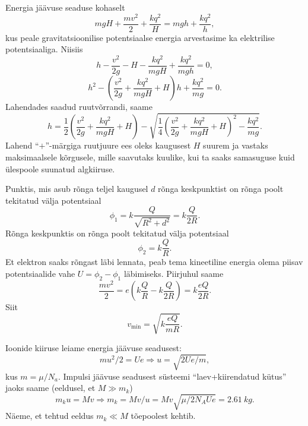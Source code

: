 \documentclass[10pt]{article}
\begin{document}
{%

\solu
Energia jäävuse seaduse kohaselt
\[
mgH + \frac{mv^2}{2} + \frac{kq^2}{H} = mgh + \frac{kq^2}{h},
\]
kus peale gravitatsioonilise potentsiaalse energia arvestasime ka elektrilise potentsiaaliga. Niisiis
\[
h-\frac{v^{2}}{2 g}-H-\frac{k q^{2}}{m g H}+\frac{k q^{2}}{m g h}=0,
\]
\[
h^{2}-\left(\frac{v^{2}}{2 g}+\frac{k q^{2}}{m g H}+H\right) h+\frac{k q^{2}}{m g}=0.
\]
Lahendades saadud ruutvõrrandi, saame
\[
h=\frac{1}{2}\left(\frac{v^{2}}{2 g}+\frac{k q^{2}}{m g H}+H\right)-\sqrt{\frac{1}{4}\left(\frac{v^{2}}{2 g}+\frac{k q^{2}}{m g H}+H\right)^{2}-\frac{k q^{2}}{m g}}.
\]
Lahend \enquote{$+$}-märgiga ruutjuure ees oleks kaugusest $H$ suurem ja vastaks maksimaalsele kõrgusele, mille saavutaks kuulike, kui ta saaks samasuguse kuid ülespoole suunatud algkiiruse.
\probend
\bigskip


\solu
Punktis, mis asub rõnga teljel kaugusel $d$ rõnga keskpunktist on rõnga poolt tekitatud välja potentsiaal
\[
\phi_{1}=k \frac{Q}{\sqrt{R^{2}+d^{2}}}=k \frac{Q}{2 R}.
\]
Rõnga keskpunktis on rõnga poolt tekitatud välja potentsiaal
\[
\phi_{2}=k \frac{Q}{R}.
\]
Et elektron saaks rõngast läbi lennata, peab tema kineetiline energia olema piisav
potentsiaalide vahe $U = \phi_2 - \phi_1$ läbimiseks. Piirjuhul saame
\[
\frac{m v^{2}}{2}=e\left(k \frac{Q}{R}-k \frac{Q}{2 R}\right)=k \frac{e Q}{2 R}.
\]
Siit
\[
v_{\min }=\sqrt{k \frac{e Q}{m R}}.
\]
\probend
\bigskip


\solu
Ioonide kiiruse leiame energia jäävuse seadusest:
$$mu^2/2=Ue \Rightarrow u=\sqrt{2Ue/m},$$
kus $m=\mu/N_a$.
Impulsi jäävuse seadusest süsteemi ``laev+kiirendatud kütus'' jaoks saame (eeldusel, et $M\gg m_k$)
$$m_ku=Mv \Rightarrow m_k=Mv/u=Mv\sqrt{\mu/2N_AUe}=\SI{2,61}{kg}.$$
Näeme, et tehtud eeldus $m_k\ll M$ tõepoolest kehtib.
\probend
\bigskip


}
\end{document}
